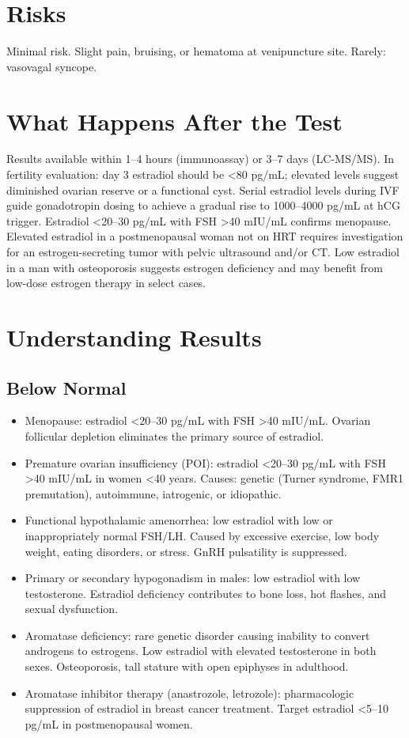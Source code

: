 \section*{Risks}
Minimal risk. Slight pain, bruising, or hematoma at venipuncture site. Rarely: vasovagal syncope.

\section*{What Happens After the Test}
Results available within 1--4 hours (immunoassay) or 3--7 days (LC-MS/MS). In fertility evaluation: day 3 estradiol should be <80 pg/mL; elevated levels suggest diminished ovarian reserve or a functional cyst. Serial estradiol levels during IVF guide gonadotropin dosing to achieve a gradual rise to 1000--4000 pg/mL at hCG trigger. Estradiol <20--30 pg/mL with FSH >40 mIU/mL confirms menopause. Elevated estradiol in a postmenopausal woman not on HRT requires investigation for an estrogen-secreting tumor with pelvic ultrasound and/or CT. Low estradiol in a man with osteoporosis suggests estrogen deficiency and may benefit from low-dose estrogen therapy in select cases.

\section*{Understanding Results}

\subsection*{Below Normal}
\begin{itemize}
  \item Menopause: estradiol <20--30 pg/mL with FSH >40 mIU/mL. Ovarian follicular depletion eliminates the primary source of estradiol.
  \item Premature ovarian insufficiency (POI): estradiol <20--30 pg/mL with FSH >40 mIU/mL in women <40 years. Causes: genetic (Turner syndrome, FMR1 premutation), autoimmune, iatrogenic, or idiopathic.
  \item Functional hypothalamic amenorrhea: low estradiol with low or inappropriately normal FSH/LH. Caused by excessive exercise, low body weight, eating disorders, or stress. GnRH pulsatility is suppressed.
  \item Primary or secondary hypogonadism in males: low estradiol with low testosterone. Estradiol deficiency contributes to bone loss, hot flashes, and sexual dysfunction.
  \item Aromatase deficiency: rare genetic disorder causing inability to convert androgens to estrogens. Low estradiol with elevated testosterone in both sexes. Osteoporosis, tall stature with open epiphyses in adulthood.
  \item Aromatase inhibitor therapy (anastrozole, letrozole): pharmacologic suppression of estradiol in breast cancer treatment. Target estradiol <5--10 pg/mL in postmenopausal women.
\end{itemize}

